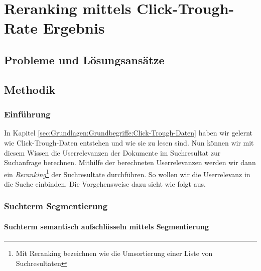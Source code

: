 %
\chapter{Reranking mittels Click-Trough-Rate Ergebnis}
\label{sec:Reranking}

\section{Probleme und Lösungsansätze}
\label{sec:Reranking:Probleme}

\section{Methodik}
\label{sec:Reranking:Methodik}

\subsection{Einführung}
\label{sec:Reranking:Methodik:Einfuehrung}

In Kapitel \ref{sec:Grundlagen:Grundbegriffe:Click-Trough-Daten} haben wir gelernt wie Click-Trough-Daten entstehen und wie sie zu lesen sind. Nun können wir mit diesem Wissen die Userrelevanzen der Dokumente im Suchresultat zur Suchanfrage berechnen. Mithilfe der berechneten Userrelevanzen werden wir dann ein \textit{Reranking}\footnote{Mit Reranking bezeichnen wie die Umsortierung einer Liste von Suchresultaten} der Suchresultate durchführen. So wollen wir die Userrelevanz in die Suche einbinden. Die Vorgehensweise dazu sieht wie folgt aus.

\subsection{Suchterm Segmentierung}
\label{sec:Reranking:Methodik:SuchtermSegmentierung}

\subsubsection{Suchterm semantisch aufschlüsseln mittels Segmentierung}
\label{sec:Reranking:Methodik:SuchtermSegmentierung:SuchtermSegmentierung}

